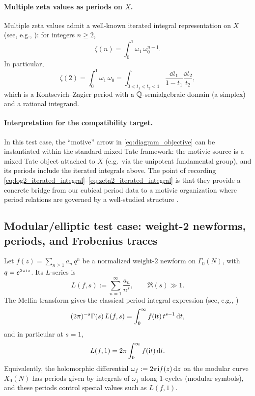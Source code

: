 \paragraph{Multiple zeta values as periods on $X$.}
Multiple zeta values admit a well-known iterated integral representation on $X$ (see, e.g., \cite{KontsevichZagier2001,Brown2012}): for integers $n\ge 2$,
\begin{equation}
\label{eq:zeta_n_iterated_integral}
\zeta(n)=\int_0^1 \omega_1\,\omega_0^{n-1}.
\end{equation}
In particular,
\begin{equation}
\label{eq:zeta2_iterated_integral}
\zeta(2)=\int_0^1 \omega_1\,\omega_0
=\int_{0<t_1<t_2<1}\frac{\dd t_1}{1-t_1}\frac{\dd t_2}{t_2},
\end{equation}
which is a Kontsevich--Zagier period with a $\mathbb{Q}$-semialgebraic domain (a simplex) and a rational integrand.

\paragraph{Interpretation for the compatibility target.}
In this test case, the ``motive'' arrow in \eqref{eq:diagram_objective} can be instantiated within the standard mixed Tate framework: the motivic source is a mixed Tate object attached to $X$ (e.g.\ via the unipotent fundamental group), and its periods include the iterated integrals above. The point of recording \eqref{eq:log2_iterated_integral}--\eqref{eq:zeta2_iterated_integral} is that they provide a concrete bridge from our cubical period data to a motivic organization where period relations are governed by a well-studied structure \cite{Brown2012,DeligneGoncharov2005}.

\subsection{Modular/elliptic test case: weight-2 newforms, periods, and Frobenius traces}
\label{app:modular_elliptic_test_case}

Let $f(z)=\sum_{n\ge 1} a_n\,q^n$ be a normalized weight-$2$ newform on $\Gamma_0(N)$, with $q=e^{2\pi \mathrm{i} z}$. Its $L$-series is
\[
L(f,s):=\sum_{n=1}^\infty \frac{a_n}{n^s},
\qquad \Re(s)\gg 1.
\]
The Mellin transform gives the classical period integral expression (see, e.g., \cite{Bump1997,DiamondShurman2005})
\begin{equation}
\label{eq:mellin_weight2}
(2\pi)^{-s}\Gamma(s)\,L(f,s)
=\int_0^\infty f(\mathrm{i} t)\,t^{s-1}\,\mathrm{d} t,
\end{equation}
and in particular at $s=1$,
\begin{equation}
\label{eq:lf1_period}
L(f,1)
=2\pi\int_0^\infty f(\mathrm{i} t)\,\mathrm{d} t.
\end{equation}
Equivalently, the holomorphic differential $\omega_f:=2\pi \mathrm{i} f(z)\,\mathrm{d} z$ on the modular curve $X_0(N)$ has periods given by integrals of $\omega_f$ along $1$-cycles (modular symbols), and these periods control special values such as $L(f,1)$.

